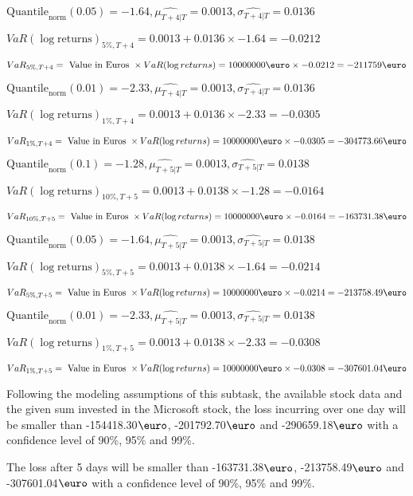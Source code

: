 $\text{Quantile}_\text{norm}(0.05) = -1.64,\hat{\mu_{T+4|T}} = 0.0013, \hat{\sigma_{T+4|T}} = 0.0136$

$VaR(\log \text{returns})_{5\%, T + 4} = 0.0013 + 0.0136\times-1.64 = -0.0212$

$VaR_{5\%, T + 4} = \text{ Value in Euros } \times VaR(\log returns) = 10 000 000 \text{\euro} \times-0.0212 = -211759 \text{\euro}$


$\text{Quantile}_\text{norm}(0.01) = -2.33,\hat{\mu_{T+4|T}} = 0.0013, \hat{\sigma_{T+4|T}} = 0.0136$

$VaR(\log \text{returns})_{1\%, T + 4} = 0.0013 + 0.0136\times-2.33 = -0.0305$

$VaR_{1\%, T + 4} = \text{ Value in Euros } \times VaR(\log returns) = 10 000 000 \text{\euro} \times-0.0305 = -304773.66 \text{\euro}$


$\text{Quantile}_\text{norm}(0.1) = -1.28,\hat{\mu_{T+5|T}} = 0.0013, \hat{\sigma_{T+5|T}} = 0.0138$

$VaR(\log \text{returns})_{10\%, T + 5} = 0.0013 + 0.0138\times-1.28 = -0.0164$

$VaR_{10\%, T + 5} = \text{ Value in Euros } \times VaR(\log returns) = 10 000 000 \text{\euro} \times-0.0164 = -163731.38 \text{\euro}$


$\text{Quantile}_\text{norm}(0.05) = -1.64,\hat{\mu_{T+5|T}} = 0.0013, \hat{\sigma_{T+5|T}} = 0.0138$

$VaR(\log \text{returns})_{5\%, T + 5} = 0.0013 + 0.0138\times-1.64 = -0.0214$

$VaR_{5\%, T + 5} = \text{ Value in Euros } \times VaR(\log returns) = 10 000 000 \text{\euro} \times-0.0214 = -213758.49 \text{\euro}$


$\text{Quantile}_\text{norm}(0.01) = -2.33,\hat{\mu_{T+5|T}} = 0.0013, \hat{\sigma_{T+5|T}} = 0.0138$

$VaR(\log \text{returns})_{1\%, T + 5} = 0.0013 + 0.0138\times-2.33 = -0.0308$

$VaR_{1\%, T + 5} = \text{ Value in Euros } \times VaR(\log returns) = 10 000 000 \text{\euro} \times-0.0308 = -307601.04 \text{\euro}$


Following the modeling assumptions of this subtask, the available stock data and the given sum invested in the Microsoft stock, the loss incurring over one day will be smaller than -154418.30$\text{\euro}$, -201792.70$\text{\euro}$  and -290659.18$\text{\euro}$  with a confidence level of 90\%, 95\%  and 99\%.

The loss after 5 days will be smaller than -163731.38$\text{\euro}$, -213758.49$\text{\euro}$  and -307601.04$\text{\euro}$  with a confidence level of 90\%, 95\%  and 99\%.

